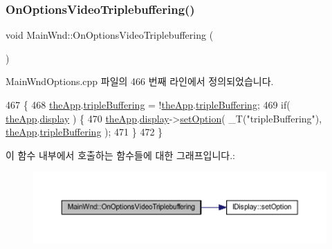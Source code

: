 \subsubsection{\texorpdfstring{On\+Options\+Video\+Triplebuffering()}{OnOptionsVideoTriplebuffering()}}
{\footnotesize\ttfamily void Main\+Wnd\+::\+On\+Options\+Video\+Triplebuffering (\begin{DoxyParamCaption}{ }\end{DoxyParamCaption})\hspace{0.3cm}{\ttfamily [protected]}}



Main\+Wnd\+Options.\+cpp 파일의 466 번째 라인에서 정의되었습니다.


\begin{DoxyCode}
467 \{
468     \mbox{\hyperlink{_v_b_a_8cpp_a8095a9d06b37a7efe3723f3218ad8fb3}{theApp}}.\mbox{\hyperlink{class_v_b_a_af597e2c2466efdc6365a5d725651b855}{tripleBuffering}} = !\mbox{\hyperlink{_v_b_a_8cpp_a8095a9d06b37a7efe3723f3218ad8fb3}{theApp}}.\mbox{\hyperlink{class_v_b_a_af597e2c2466efdc6365a5d725651b855}{tripleBuffering}};
469     \textcolor{keywordflow}{if}( \mbox{\hyperlink{_v_b_a_8cpp_a8095a9d06b37a7efe3723f3218ad8fb3}{theApp}}.\mbox{\hyperlink{class_v_b_a_a940e5bad8b3ed2436888dbcd03bfd563}{display}} ) \{
470         \mbox{\hyperlink{_v_b_a_8cpp_a8095a9d06b37a7efe3723f3218ad8fb3}{theApp}}.\mbox{\hyperlink{class_v_b_a_a940e5bad8b3ed2436888dbcd03bfd563}{display}}->\mbox{\hyperlink{class_i_display_a1766244708c252bb8781892c76c20ba9}{setOption}}( \_T(\textcolor{stringliteral}{"tripleBuffering"}), 
      \mbox{\hyperlink{_v_b_a_8cpp_a8095a9d06b37a7efe3723f3218ad8fb3}{theApp}}.\mbox{\hyperlink{class_v_b_a_af597e2c2466efdc6365a5d725651b855}{tripleBuffering}} );
471     \}
472 \}
\end{DoxyCode}
이 함수 내부에서 호출하는 함수들에 대한 그래프입니다.\+:
\nopagebreak
\begin{figure}[H]
\begin{center}
\leavevmode
\includegraphics[width=350pt]{class_main_wnd_a3d08e3bf2be9dee73c57674e4a6d890e_cgraph}
\end{center}
\end{figure}
\mbox{\label{class_main_wnd_ad539bc63bc7704f4aa66e3a75a39826b}} 
